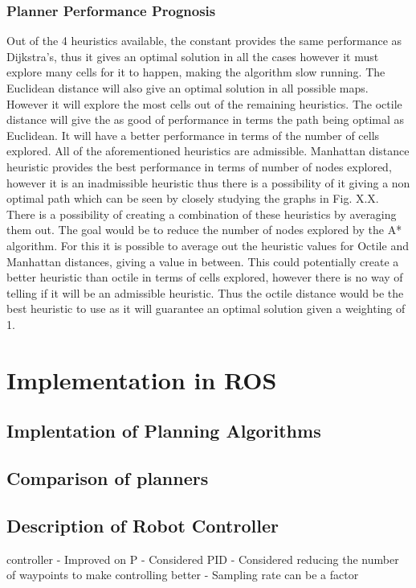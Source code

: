 \documentclass[a4paper,12pt]{article}
\begin{document}
			\subsubsection{Planner Performance Prognosis}
				Out of the 4 heuristics available, the constant provides the same performance as Dijkstra’s, thus it gives an optimal solution in all the cases however it must explore many cells for it to happen, making the algorithm slow running. The Euclidean distance will also give an optimal solution in all possible maps. However it will explore the most cells out of the remaining heuristics. The octile distance will give the as good of performance in terms the path being optimal as Euclidean. It will have a better performance in terms of the number of cells explored. All of the aforementioned heuristics are admissible. Manhattan distance heuristic provides the best performance in terms of number of nodes explored, however it is an inadmissible heuristic thus there is a possibility of it giving a non optimal path which can be seen by closely studying the graphs in Fig. X.X.
				\\
				There is a possibility of creating a combination of these heuristics by averaging them out. The goal would be to reduce the number of nodes explored by the A* algorithm. For this it is possible to average out the heuristic values for Octile and Manhattan distances, giving a value in between. This could potentially create a better heuristic than octile in terms of cells explored, however there is no way of telling if it will be an admissible heuristic. Thus the octile distance would be the best heuristic to use as it will guarantee an optimal solution given a weighting of 1. 

	\section{Implementation in ROS}
	
		\subsection{Implentation of Planning Algorithms}
		
		\subsection{Comparison of planners}
		
		\subsection{Description of Robot Controller}
			controller 
			- Improved on P
			- Considered PID 
			- Considered reducing the number of waypoints to make controlling better 
			- Sampling rate can be a factor 
	
\end{document}
